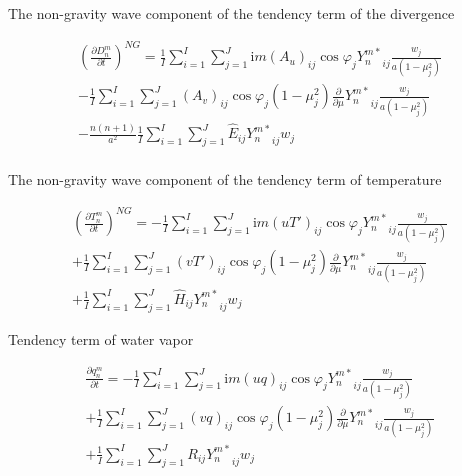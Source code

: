 The non-gravity wave component of the tendency term of the divergence

\begin{eqnarray}
  \left( \frac{\partial{D_n^m}}{\partial {t}} \right)^{NG}
   =  \frac{1}{I} \sum_{i=1}^{I} \sum_{j=1}^{J}  
          \mathrm{i}m (A_u)_{ij} \cos \varphi_j
          {Y_n^{m *}}_{ij}
         \frac{w_j}{a(1-\mu_j^{2})}
          \\
   -\frac{1}{I} \sum_{i=1}^{I} \sum_{j=1}^{J}  
          (A_v)_{ij} \cos \varphi_j
          (1-\mu_j^2)
          \frac{\partial }{\partial \mu} {Y_n^{m *}}_{ij}
          \frac{w_j}{a(1-\mu_j^{2})}
          \\
   -\frac{n(n+1)}{a^{2}}
         \frac{1}{I} \sum_{i=1}^{I} \sum_{j=1}^{J}  
          \hat{E}_{ij}  {Y_n^{m *}}_{ij} w_j
          \\
\end{eqnarray}

The non-gravity wave component of the tendency term of temperature

\begin{eqnarray}
  \left( \frac{\partial{T_n^m}}{\partial {t}} \right)^{NG}
   =  - \frac{1}{I} \sum_{i=1}^{I} \sum_{j=1}^{J}  
          \mathrm{i}m (u T')_{ij} \cos \varphi_j
          {Y_n^{m *}}_{ij}
         \frac{w_j}{a(1-\mu_j^{2})}
          \\
     + \frac{1}{I} \sum_{i=1}^{I} \sum_{j=1}^{J}  
          (v T')_{ij} \cos \varphi_j
          (1-\mu_j^2)
          \frac{\partial }{\partial \mu} {Y_n^{m *}}_{ij}
          \frac{w_j}{a(1-\mu_j^{2})}
          \\
     + \frac{1}{I} \sum_{i=1}^{I} \sum_{j=1}^{J}  
          \hat{H}_{ij}
          {Y_n^{m *}}_{ij} w_j
\end{eqnarray}

Tendency term of water vapor

\begin{eqnarray}
  \frac{\partial{q_n^m}}{\partial {t}}
   =  - \frac{1}{I} \sum_{i=1}^{I} \sum_{j=1}^{J}  
          \mathrm{i}m (uq)_{ij} \cos \varphi_j
          {Y_n^{m *}}_{ij}
         \frac{w_j}{a(1-\mu_j^{2})}
          \\
     + \frac{1}{I} \sum_{i=1}^{I} \sum_{j=1}^{J}  
          (vq)_{ij} \cos \varphi_j
          (1-\mu_j^2)
          \frac{\partial }{\partial \mu} {Y_n^{m *}}_{ij}
          \frac{w_j}{a(1-\mu_j^{2})}
          \\
     + \frac{1}{I} \sum_{i=1}^{I} \sum_{j=1}^{J}  
          R_{ij}
          {Y_n^{m *}}_{ij} w_j
\end{eqnarray}

